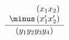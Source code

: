 \documentclass{article}
\begin{document}
\begin{equation}
\frac{
    \begin{array}[b]{r}
      \left( x_1 x_2 \right)\\
      \minus \left( x'_1 x'_2 \right)
    \end{array}
  }{
    \left( y_1y_2y_3y_4 \right)
  }
\end{equation}
\end{document}
